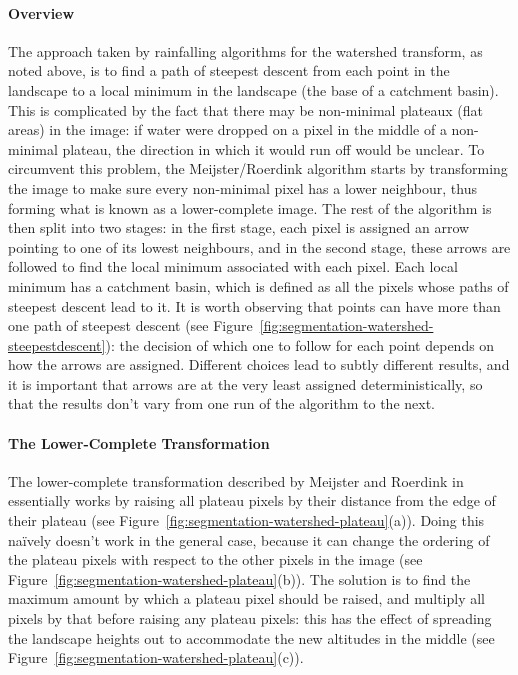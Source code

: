 
\paragraph{Overview}

The approach taken by rainfalling algorithms for the watershed transform, as noted above, is to find a path of steepest descent from each point in the landscape to a local minimum in the landscape (the base of a catchment basin). This is complicated by the fact that there may be non-minimal plateaux (flat areas) in the image: if water were dropped on a pixel in the middle of a non-minimal plateau, the direction in which it would run off would be unclear. To circumvent this problem, the Meijster/Roerdink algorithm starts by transforming the image to make sure every non-minimal pixel has a lower neighbour, thus forming what is known as a lower-complete image. The rest of the algorithm is then split into two stages: in the first stage, each pixel is assigned an arrow pointing to one of its lowest neighbours, and in the second stage, these arrows are followed to find the local minimum associated with each pixel. Each local minimum has a catchment basin, which is defined as all the pixels whose paths of steepest descent lead to it. It is worth observing that points can have more than one path of steepest descent (see Figure~\ref{fig:segmentation-watershed-steepestdescent}): the decision of which one to follow for each point depends on how the arrows are assigned. Different choices lead to subtly different results, and it is important that arrows are at the very least assigned deterministically, so that the results don't vary from one run of the algorithm to the next.

\paragraph{The Lower-Complete Transformation}

The lower-complete transformation described by Meijster and Roerdink in \cite{meijster98} essentially works by raising all plateau pixels by their distance from the edge of their plateau (see Figure~\ref{fig:segmentation-watershed-plateau}(a)). Doing this na\"ively doesn't work in the general case, because it can change the ordering of the plateau pixels with respect to the other pixels in the image (see Figure~\ref{fig:segmentation-watershed-plateau}(b)). The solution is to find the maximum amount by which a plateau pixel should be raised, and multiply all pixels by that before raising any plateau pixels: this has the effect of spreading the landscape heights out to accommodate the new altitudes in the middle (see Figure~\ref{fig:segmentation-watershed-plateau}(c)).

